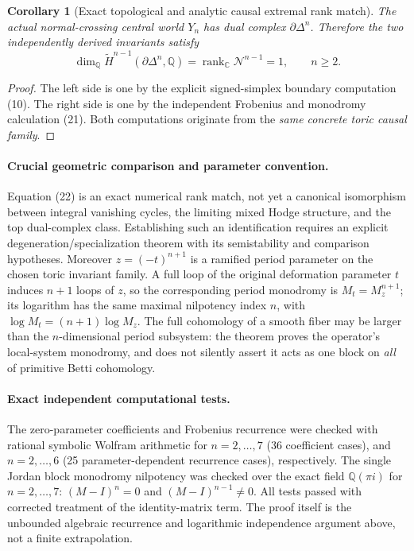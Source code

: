 \documentclass[11pt]{article}
\newtheorem{corollary}{Corollary}
\begin{document}
\begin{corollary}[Exact topological and analytic causal extremal rank match]
The actual normal-crossing central world $Y_n$
has dual complex $\partial\Delta^n$. Therefore
the two independently derived invariants satisfy
\[
\boxed{\quad
 \dim_{\mathbb Q}\widetilde H^{n-1}
    (\partial\Delta^n,\mathbb Q)
 = \operatorname{rank}_{\mathbb C}\mathcal N^{n-1}
 =1,\qquad n\ge2.
\quad}\tag{22}
\]
\end{corollary}
\begin{proof}
The left side is one by the explicit signed-simplex
boundary computation (10). The right side is one
by the independent Frobenius and monodromy
calculation (21). Both computations originate
from the \emph{same concrete toric causal family}.
\end{proof}

\paragraph{Crucial geometric comparison and parameter convention.}
Equation (22) is an exact numerical rank match, not yet
a canonical isomorphism between integral vanishing cycles,
the limiting mixed Hodge structure, and the top
dual-complex class. Establishing such an identification
requires an explicit degeneration/specialization theorem
with its semistability and comparison hypotheses.
Moreover $z=(-t)^{n+1}$ is a ramified period parameter
on the chosen toric invariant family. A full loop of
the original deformation parameter $t$ induces
$n+1$ loops of $z$, so the corresponding period
monodromy is $M_t=M_z^{n+1}$; its logarithm has
the same maximal nilpotency index $n$, with
$\log M_t=(n+1)\log M_z$.
The full cohomology of a smooth fiber may be
larger than the $n$-dimensional period subsystem:
the theorem proves the operator's local-system
monodromy, and does not silently assert it acts
as one block on \emph{all} of primitive Betti cohomology.

\paragraph{Exact independent computational tests.}
The zero-parameter coefficients and Frobenius recurrence
were checked with rational symbolic Wolfram arithmetic for
$n=2,\dots,7$ (36 coefficient cases), and
$n=2,\dots,6$ (25 parameter-dependent recurrence cases),
respectively. The single Jordan block monodromy
nilpotency was checked over the exact field
$\mathbb Q(\pi i)$ for $n=2,\dots,7$:
$(M-I)^n=0$ and $(M-I)^{n-1}\ne0$.
All tests passed with corrected treatment of the
identity-matrix term. The proof itself is the
unbounded algebraic recurrence and logarithmic
independence argument above, not a finite extrapolation.
\end{document}
